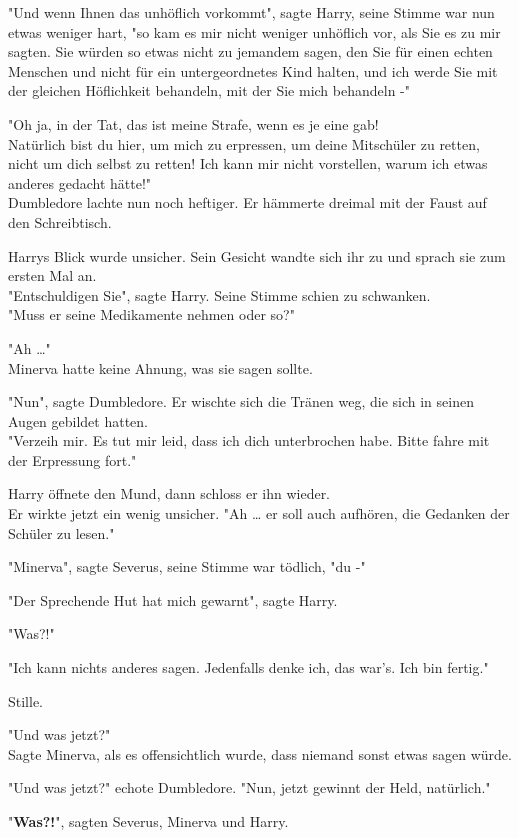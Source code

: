 {"Und wenn Ihnen das unhöflich vorkommt", sagte Harry, seine Stimme war nun etwas weniger hart, "so kam es mir nicht weniger unhöflich vor, als Sie es zu mir sagten. Sie würden so etwas nicht zu jemandem sagen, den Sie für einen echten Menschen und nicht für ein untergeordnetes Kind halten, und ich werde Sie mit der gleichen Höflichkeit behandeln, mit der Sie mich behandeln -"

"Oh ja, in der Tat, das ist meine Strafe, wenn es je eine gab!\\ Natürlich bist du hier, um mich zu erpressen, um deine Mitschüler zu retten, nicht um dich selbst zu retten! Ich kann mir nicht vorstellen, warum ich etwas anderes gedacht hätte!"\\ Dumbledore lachte nun noch heftiger. Er hämmerte dreimal mit der Faust auf den Schreibtisch.

Harrys Blick wurde unsicher. Sein Gesicht wandte sich ihr zu und sprach sie zum ersten Mal an.\\ "Entschuldigen Sie", sagte Harry. Seine Stimme schien zu schwanken.\\ "Muss er seine Medikamente nehmen oder so?"

"Ah …"\\ Minerva hatte keine Ahnung, was sie sagen sollte.

"Nun", sagte Dumbledore. Er wischte sich die Tränen weg, die sich in seinen Augen gebildet hatten.\\ "Verzeih mir. Es tut mir leid, dass ich dich unterbrochen habe. Bitte fahre mit der Erpressung fort."

Harry öffnete den Mund, dann schloss er ihn wieder.\\ Er wirkte jetzt ein wenig unsicher. "Ah … er soll auch aufhören, die Gedanken der Schüler zu lesen."

"Minerva", sagte Severus, seine Stimme war tödlich, "du -"

"Der Sprechende Hut hat mich gewarnt", sagte Harry.

"Was?!"

"Ich kann nichts anderes sagen. Jedenfalls denke ich, das war's. Ich bin fertig."

Stille.

"Und was jetzt?"\\ Sagte Minerva, als es offensichtlich wurde, dass niemand sonst etwas sagen würde.

"Und was jetzt?" echote Dumbledore. "Nun, jetzt gewinnt der Held, natürlich."

"\textbf{Was?!}", sagten Severus, Minerva und Harry.

}
